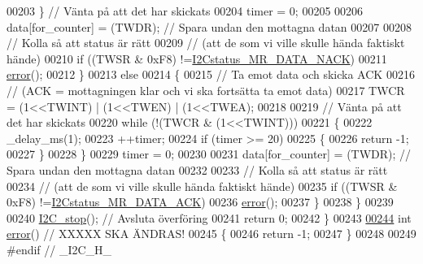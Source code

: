 \begin{DoxyCode}
00203             \}                   \textcolor{comment}{// Vänta på att det har skickats}
00204             timer = 0;
00205 
00206             data[for\_counter] = (TWDR);     \textcolor{comment}{// Spara undan den mottagna datan}
00207 
00208             \textcolor{comment}{// Kolla så att status är rätt}
00209             \textcolor{comment}{// (att de som vi ville skulle hända faktiskt hände)}
00210             \textcolor{keywordflow}{if} ((TWSR & 0xF8) !=\hyperlink{_i2_c_8h_a3678a376b6b796511e60d0eda8a89dbe}{I2Cstatus\_MR\_DATA\_NACK})       
00211             \hyperlink{_i2_c_8c_ad1a5ba420409525ff5ab1be86ac5e526}{error}();
00212         \}
00213         \textcolor{keywordflow}{else}
00214         \{   
00215             \textcolor{comment}{// Ta emot data och skicka ACK}
00216             \textcolor{comment}{// (ACK = mottagningen klar och vi ska fortsätta ta emot data)}
00217             TWCR = (1<<TWINT) | (1<<TWEN) | (1<<TWEA);      
00218 
00219             \textcolor{comment}{// Vänta på att det har skickats}
00220             \textcolor{keywordflow}{while} (!(TWCR & (1<<TWINT)))
00221             \{
00222                 \_delay\_ms(1);
00223                 ++timer;
00224                 \textcolor{keywordflow}{if} (timer >= 20)
00225                 \{
00226                     \textcolor{keywordflow}{return} -1;
00227                 \}
00228             \}                   
00229             timer = 0;
00230 
00231             data[for\_counter] = (TWDR);     \textcolor{comment}{// Spara undan den mottagna datan}
00232 
00233             \textcolor{comment}{// Kolla så att status är rätt}
00234             \textcolor{comment}{// (att de som vi ville skulle hända faktiskt hände)}
00235             \textcolor{keywordflow}{if} ((TWSR & 0xF8) !=\hyperlink{_i2_c_8h_aae56c6775054400d706c68b4701a1659}{I2Cstatus\_MR\_DATA\_ACK})     
00236             \hyperlink{_i2_c_8c_ad1a5ba420409525ff5ab1be86ac5e526}{error}();
00237         \}
00238     \}
00239 
00240     \hyperlink{_i2_c_8c_af8dcc1bcb3e1c6c0fcdca4cf599a239b}{I2C\_stop}();     \textcolor{comment}{// Avsluta överföring}
00241     \textcolor{keywordflow}{return} 0;
00242 \}
00243 
\hypertarget{_i2_c_8c_source.tex_l00244}{}\hyperlink{_i2_c_8h_ad1a5ba420409525ff5ab1be86ac5e526}{00244} \textcolor{keywordtype}{int} \hyperlink{_i2_c_8c_ad1a5ba420409525ff5ab1be86ac5e526}{error}()            \textcolor{comment}{// XXXXX SKA ÄNDRAS!}
00245 \{
00246     \textcolor{keywordflow}{return} -1;
00247 \}
00248 
00249 \textcolor{preprocessor}{#endif  // \_I2C\_H\_}
\end{DoxyCode}
